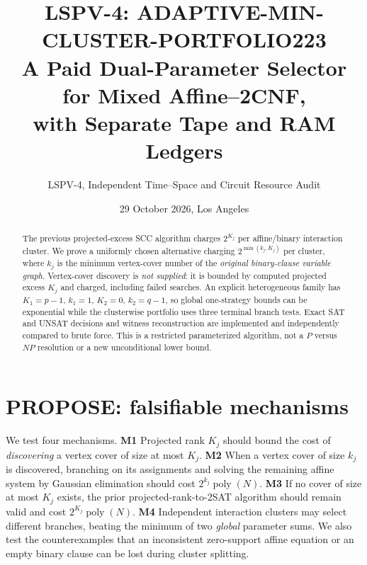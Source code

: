 \documentclass[11pt]{article}
\title{LSPV-4: ADAPTIVE-MIN-CLUSTER-PORTFOLIO223\\\large A Paid Dual-Parameter Selector for Mixed Affine--2CNF,\\with Separate Tape and RAM Ledgers}
\author{LSPV-4, Independent Time--Space and Circuit Resource Audit}
\date{29 October 2026, Los Angeles}
\newcommand{\poly}{\operatorname{poly}}
\begin{document}
\maketitle
\begin{abstract}
The previous projected-excess SCC algorithm charges $2^{K_j}$ per affine/binary interaction cluster. We prove a uniformly chosen alternative charging $2^{\min(k_j,K_j)}$ per cluster, where $k_j$ is the minimum vertex-cover number of the \emph{original binary-clause variable graph}. Vertex-cover discovery is \emph{not supplied}: it is bounded by computed projected excess $K_j$ and charged, including failed searches. An explicit heterogeneous family has $K_1=p-1$, $k_1=1$, $K_2=0$, $k_2=q-1$, so global one-strategy bounds can be exponential while the clusterwise portfolio uses three terminal branch tests. Exact SAT and UNSAT decisions and witness reconstruction are implemented and independently compared to brute force. This is a restricted parameterized algorithm, not a $P$ versus $NP$ resolution or a new unconditional lower bound.
\end{abstract}

\section{PROPOSE: falsifiable mechanisms}
We test four mechanisms. \textbf{M1} Projected rank $K_j$ should bound the cost of \emph{discovering} a vertex cover of size at most $K_j$. \textbf{M2} When a vertex cover of size $k_j$ is discovered, branching on its assignments and solving the remaining affine system by Gaussian elimination should cost $2^{k_j}\poly(N)$. \textbf{M3} If no cover of size at most $K_j$ exists, the prior projected-rank-to-2SAT algorithm should remain valid and cost $2^{K_j}\poly(N)$. \textbf{M4} Independent interaction clusters may select different branches, beating the minimum of two \emph{global} parameter sums. We also test the counterexamples that an inconsistent zero-support affine equation or an empty binary clause can be lost during cluster splitting.
\end{document}
